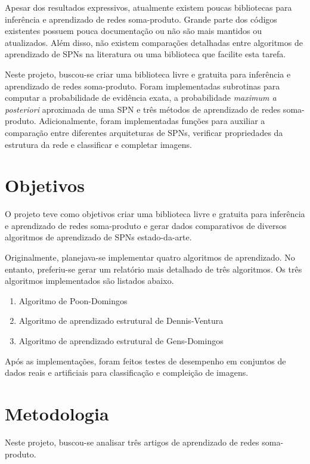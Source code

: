 \documentclass[12pt]{article}
\theoremstyle{plain}
\numberwithin{equation}{section}
\begin{document}
Apesar dos resultados expressivos, atualmente existem poucas bibliotecas para inferência e
aprendizado de redes soma-produto. Grande parte dos códigos existentes possuem pouca documentação
ou não são mais mantidos ou atualizados. Além disso, não existem comparações detalhadas entre
algoritmos de aprendizado de SPNs na literatura ou uma biblioteca que facilite esta tarefa.

Neste projeto, buscou-se criar uma biblioteca livre e gratuita para inferência e aprendizado de
redes soma-produto. Foram implementadas subrotinas para computar a probabilidade de evidência
exata, a probabilidade \textit{maximum a posteriori} aproximada de uma SPN e três métodos de
aprendizado de redes soma-produto. Adicionalmente, foram implementadas funções para auxiliar a
comparação entre diferentes arquiteturas de SPNs, verificar propriedades da estrutura da rede e
classificar e completar imagens.

\section{Objetivos}

O projeto teve como objetivos criar uma biblioteca livre e gratuita para inferência e aprendizado
de redes soma-produto e gerar dados comparativos de diversos algoritmos de aprendizado de SPNs
estado-da-arte.

Originalmente, planejava-se implementar quatro algoritmos de aprendizado. No entanto, preferiu-se
gerar um relatório mais detalhado de três algoritmos. Os três algoritmos implementados são listados
abaixo.

\begin{enumerate}[label=\alph*.]
  \item Algoritmo de Poon-Domingos~\cite{poon-domingos}
  \item Algoritmo de aprendizado estrutural de Dennis-Ventura~\cite{clustering}
  \item Algoritmo de aprendizado estrutural de Gens-Domingos~\cite{gens-domingos}
\end{enumerate}

Após as implementações, foram feitos testes de desempenho em conjuntos de dados reais e artificiais
para classificação e compleição de imagens.

\section{Metodologia}

Neste projeto, buscou-se analisar três artigos de aprendizado de redes soma-produto.
\end{document}
